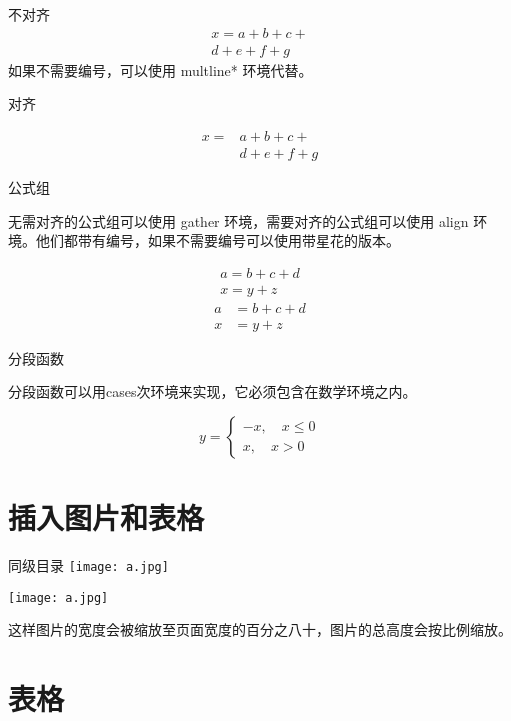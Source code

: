 \documentclass[UTF8]{ctexart} %
\begin{document}
不对齐
\begin{multline}
x = a+b+c+{} \\
d+e+f+g
\end{multline}
如果不需要编号，可以使用 multline* 环境代替。

对齐

\[\begin{aligned}
x ={}& a+b+c+{} \\
&d+e+f+g
\end{aligned}\]

公式组

无需对齐的公式组可以使用 gather 环境，需要对齐的公式组可以使用 align 环境。他们都带有编号，如果不需要编号可以使用带星花的版本。

\begin{gather}
a = b+c+d \\
x = y+z
\end{gather}
\begin{align}
a &= b+c+d \\
x &= y+z
\end{align}

分段函数

分段函数可以用cases次环境来实现，它必须包含在数学环境之内。

\[ y= \begin{cases}
-x,\quad x\leq 0 \\
x,\quad x>0
\end{cases} \]


\section{插入图片和表格}

同级目录
\texttt{[image: a.jpg]}


\texttt{[image: a.jpg]}

这样图片的宽度会被缩放至页面宽度的百分之八十，图片的总高度会按比例缩放。

\section{表格}

\end{document}
